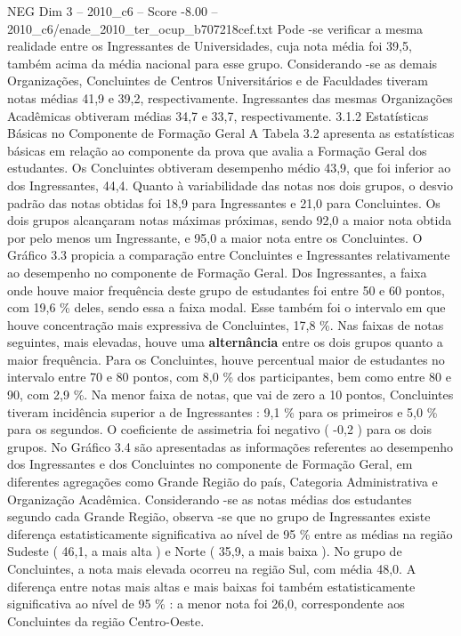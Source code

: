 \begin{textsample}{NEG Dim 3 – 2010\_c6 – Score -8.00 – 2010\_c6/enade\_2010\_ter\_ocup\_b707218cef.txt}
Pode -se verificar a mesma realidade entre os Ingressantes de Universidades, cuja nota média foi 39,5, também acima da média nacional para esse grupo.
Considerando -se as demais Organizações, Concluintes de Centros Universitários e de Faculdades tiveram notas médias 41,9 e 39,2, respectivamente.
Ingressantes das mesmas Organizações Acadêmicas obtiveram médias 34,7 e 33,7, respectivamente. 3.1.2 Estatísticas Básicas no Componente de Formação Geral A Tabela 3.2 apresenta as estatísticas básicas em relação ao componente da prova que avalia a Formação Geral dos estudantes.
Os Concluintes obtiveram desempenho médio 43,9, que foi inferior ao dos Ingressantes, 44,4.
Quanto à variabilidade das notas nos dois grupos, o desvio padrão das notas obtidas foi 18,9 para Ingressantes e 21,0 para Concluintes.
Os dois grupos alcançaram notas máximas próximas, sendo 92,0 a maior nota obtida por pelo menos um Ingressante, e 95,0 a maior nota entre os Concluintes.
O Gráfico 3.3 propicia a comparação entre Concluintes e Ingressantes relativamente ao desempenho no componente de Formação Geral.
Dos Ingressantes, a faixa onde houve maior frequência deste grupo de estudantes foi entre 50 e 60 pontos, com 19,6 \% deles, sendo essa a faixa modal.
Esse também foi o intervalo em que houve concentração mais expressiva de Concluintes, 17,8 \%.
Nas faixas de notas seguintes, mais elevadas, houve uma \textbf{alternância} entre os dois grupos quanto a maior frequência.
Para os Concluintes, houve percentual maior de estudantes no intervalo entre 70 e 80 pontos, com 8,0 \% dos participantes, bem como entre 80 e 90, com 2,9 \%.
Na menor faixa de notas, que vai de zero a 10 pontos, Concluintes tiveram incidência superior a de Ingressantes : 9,1 \% para os primeiros e 5,0 \% para os segundos.
O coeficiente de assimetria foi negativo ( -0,2 ) para os dois grupos.
No Gráfico 3.4 são apresentadas as informações referentes ao desempenho dos Ingressantes e dos Concluintes no componente de Formação Geral, em diferentes agregações como Grande Região do país, Categoria Administrativa e Organização Acadêmica.
Considerando -se as notas médias dos estudantes segundo cada Grande Região, observa -se que no grupo de Ingressantes existe diferença estatisticamente significativa ao nível de 95 \% entre as médias na região Sudeste ( 46,1, a mais alta ) e Norte ( 35,9, a mais baixa ).
No grupo de Concluintes, a nota mais elevada ocorreu na região Sul, com média 48,0.
A diferença entre notas mais altas e mais baixas foi também estatisticamente significativa ao nível de 95 \% : a menor nota foi 26,0, correspondente aos Concluintes da região Centro-Oeste.

\end{textsample}
